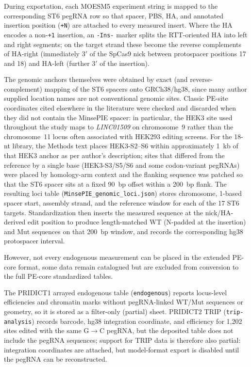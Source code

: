 \documentclass{article}
\begin{document}
During exportation, each MOESM5 experiment string is mapped to the corresponding ST6 pegRNA row so that spacer, PBS, HA, and annotated insertion position (\texttt{+N}) are attached to every measured insert. Where the HA encodes a non-\texttt{+1} insertion, an \texttt{-Ins-} marker splits the RTT-oriented HA into left and right segments; on the target strand these become the reverse complements of HA-right (immediately 3$'$ of the SpCas9 nick between protospacer positions 17 and 18) and HA-left (further 3$'$ of the insertion).

The genomic anchors themselves were obtained by exact (and reverse-complement) mapping of the ST6 spacers onto GRCh38/hg38, since many author supplied location names are not conventional genomic sites. Classic PE-site coordinates cited elsewhere in the literature were checked and discarded when they did not contain the MinsePIE spacer: in particular, the HEK3 site used throughout the study maps to \textit{LINC01509} on chromosome~9 rather than the chromosome~11 locus often associated with HEK293 editing screens. For the 18-nt library, the Methods text places HEK3-S2--S6 within approximately 1~kb of that HEK3 anchor as per author's description; sites that differed from the reference by a single base (HEK3-S3/S5/S6 and some codon-variant pegRNAs) were placed by homology-arm context and the flanking sequence was patched so that the ST6 spacer sits at a fixed 90~bp offset within a 200~bp flank. The resulting loci table (\nolinkurl{MinsePIE\_genomic\_loci.json}) stores chromosome, 1-based spacer start, assembly strand, and the reference window for each of the 17 ST6 targets. Standardization then inserts the measured sequence at the nick/HA-derived edit position to produce length-matched WT (N-padded at the insertion) and Mut sequences on that 200~bp window, and records the corresponding hg38 protospacer interval.

However, not every endogenous measurement can be placed in the extended PE-core format, some data remain catalogued but are excluded from conversion to the full PE-core standardized tables.

The PRIDICT1 arrayed endogenous table (\nolinkurl{endogenous}) reports locus-level efficiencies and chromatin marks without pegRNA-linked WT/Mut sequences or geometry, so it is stored as a filter-only (partial) sheet. PRIDICT2 TRIP (\nolinkurl{trip-analysis}) records barcode, hg38 integration coordinate, and efficiency for 1{,}202 sites edited with the same G$\to$C pegRNA, but the deposited table does not include the pegRNA sequences; support for TRIP data is therefore also partial: integration coordinates are attached, but model-format export is disabled until the pegRNA can be reconstructed.
\end{document}
